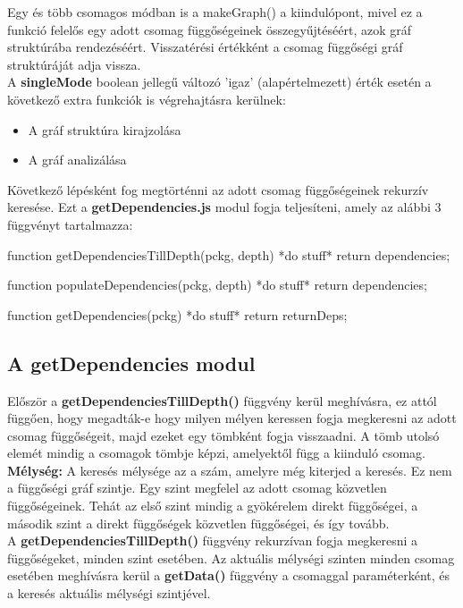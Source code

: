 Egy és több csomagos módban is a makeGraph() a kiindulópont, mivel ez a funkció felelős egy adott csomag függőségeinek összegyűjtéséért, azok gráf struktúrába rendezéséért.
Visszatérési értékként a csomag függőségi gráf struktúráját adja vissza.\\

A \textbf{singleMode} boolean jellegű változó 'igaz' (alapértelmezett) érték esetén a következő extra funkciók is végrehajtásra kerülnek:
	\begin{itemize}
		\item A gráf struktúra kirajzolása
		\item A gráf analizálása
	\end{itemize}

Következő lépésként fog megtörténni az adott csomag függőségeinek rekurzív keresése. Ezt a \textbf{getDependencies.js} modul fogja teljesíteni, amely az alábbi 3 függvényt tartalmazza:

\begin{cpp}
function getDependenciesTillDepth(pckg, depth){
	*do stuff*
	return dependencies;
}

function populateDependencies(pckg, depth){
	*do stuff*
	return dependencies;
}

function getDependencies(pckg){
	*do stuff*
	return returnDeps;
}
\end{cpp}

\subsection{A getDependencies modul}

Először a \textbf{getDependenciesTillDepth()} függvény kerül meghívásra, ez attól függően, hogy megadták-e hogy milyen mélyen keressen fogja megkeresni az adott csomag függőségeit, majd ezeket egy tömbként fogja visszaadni. A tömb utolsó elemét mindig a csomagok tömbje képzi, amelyektől függ a kiinduló csomag.\\

\textbf{Mélység: }A keresés mélysége az a szám, amelyre még kiterjed a keresés. Ez nem a függőségi gráf szintje. Egy szint megfelel az adott csomag közvetlen függőségeinek. Tehát az első szint mindig a gyökérelem direkt függőségei, a második szint a direkt függőségek közvetlen függőségei, és így tovább.\\

A \textbf{getDependenciesTillDepth()} függvény rekurzívan fogja megkeresni a függőségeket, minden szint esetében. Az aktuális mélységi szinten minden csomag esetében meghívásra kerül a \textbf{getData()} függvény a csomaggal paraméterként, és a keresés aktuális mélységi szintjével.

